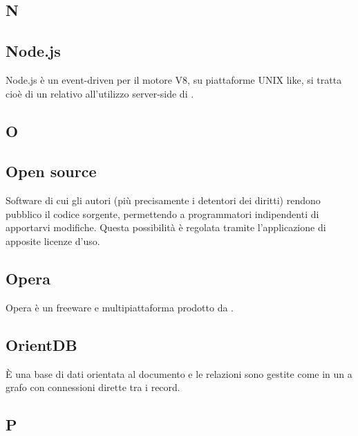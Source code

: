 \begin{center}
\Huge\section{\uppercase{N}}
\end{center}

\subsection{Node.js}
Node.js è un  event-driven per il motore  V8, su piattaforme UNIX
like, si tratta cioè di un  relativo all'utilizzo server-side di .

\newpage

\begin{center}
\Huge\section{\uppercase{O}}
\end{center}

\subsection{Open source}
Software di cui gli autori (più precisamente i detentori dei diritti) rendono pubblico
il codice sorgente, permettendo a programmatori indipendenti di apportarvi modifiche.
Questa possibilità è regolata tramite l'applicazione di apposite licenze d'uso.

\subsection{Opera}
Opera è un   freeware e multipiattaforma prodotto da  .

\subsection{OrientDB}
È una base di dati orientata al documento e le relazioni sono gestite come in un  a grafo con connessioni dirette tra i record.

\newpage

\begin{center}
\Huge\section{\uppercase{P}}
\end{center}

